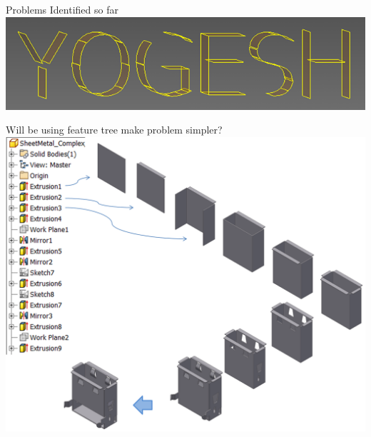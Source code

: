 \begin{frame}{Problems Identified so far}
\vspace{0.8cm}
\centering \includegraphics[width=0.85\linewidth]{../Common/images/YOGESH_Midsurf.png}
\end{frame}

%

\begin{frame}{Will be using feature tree make problem simpler?}
\vspace{0.1cm}
\centering \includegraphics[height=0.7\linewidth]{../Common/images/USB_buildup}
\end{frame}
